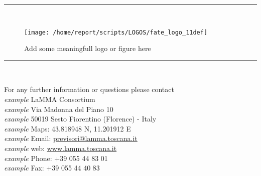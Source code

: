 \documentclass[11pt,english]{article}
\newcommand{\HRule}{\rule{\linewidth}{0.5mm}}
\begin{document}
\clearpage
\begin{center}
\HRule \\[0.4cm]
\begin{figure}[htbp]
\centering
{\texttt{[image: /home/report/scripts/LOGOS/fate\_logo\_11def]}}
\caption{Add some meaningfull logo or figure here}
\end{figure}
\HRule \\[0.4cm]
\end{center}

\vspace{5.55cm}
\begin{flushright}
\large{For any further information or questions please contact
\\\textit{example} LaMMA Consortium
\\\textit{example} Via Madonna del Piano 10
\\\textit{example} 50019 Sesto Fiorentino (Florence) - Italy
\\\textit{example} Maps: 43.818948 N, 11.201912 E
\\\textit{example} Email: \href{mailto:previsori@lamma.toscana.it}{previsori@lamma.toscana.it}
\\\textit{example} web: \href{www.lamma.toscana.it}{www.lamma.toscana.it}
\\\textit{example} Phone: +39 055 44 83 01
\\\textit{example} Fax: +39 055 44 40 83}
\end{flushright}

\end{document}
